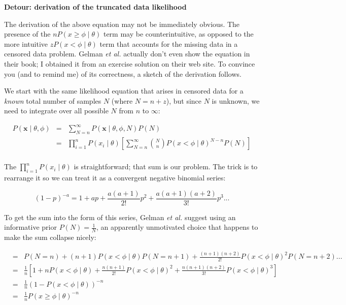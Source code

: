 \textbf{Detour: derivation of the truncated data likelihood}

The derivation of the above equation may not be immediately obvious.
The presence of the $n P(x \geq \phi \mid \theta)$ term may be
counterintuitive, as opposed to the more intuitive $z P(x < \phi \mid
\theta)$ term that accounts for the missing data in a censored data
problem. Gelman \emph{et al.} actually don't even show the equation in
their book; I obtained it from an exercise solution on their web site.
To convince you (and to remind me) of its correctness, a sketch of the
derivation follows.

We start with the same likelihood equation that arises in censored
data for a \emph{known} total number of samples $N$ (where $N=n+z$),
but since $N$ is unknown, we need to integrate over all possible $N$
from $n$ to $\infty$:

\begin{eqnarray*}
   P(\mathbf{x} \mid \theta, \phi) & = &
    \sum_{N=n}^{\infty}   P(\mathbf{x} \mid \theta, \phi, N) P(N)\\
   & = & 
    \prod_{i=1}^n P(x_i \mid \theta) 
    \left[
      \sum_{N=n}^\infty {N \choose n} P(x < \phi \mid \theta)^{N-n} P(N)
    \right]\\
\end{eqnarray*}

The $\prod_{i=1}^n P(x_i \mid \theta)$ is straightforward; that sum is
our problem. The trick is to rearrange it so we can treat it as a
convergent negative binomial series:

\[
   (1-p)^{-a} = 1 + ap + \frac{a(a+1)}{2!} p^2 +
   \frac{a(a+1)(a+2)}{3!} p^3...
\]

To get the sum into the form of this series, Gelman \emph{et al.}
suggest using an informative prior $P(N) = \frac{1}{N}$, an apparently
unmotivated choice that happens to make the sum collapse nicely:

\begin{eqnarray*}
 &=& P(N=n) 
    + (n+1) P(x < \phi \mid \theta) P(N=n+1) 
    + \frac{(n+1)(n+2)}{2!} P(x < \phi \mid \theta)^2 P(N=n+2) ...\\
 &= & \frac{1}{n} \left[
      1 
      + n P(x < \phi \mid \theta)
      + \frac{n(n+1)}{2!} P(x < \phi \mid \theta)^2 
      + \frac{n(n+1)(n+2)}{3!} P(x < \phi \mid \theta)^3 \right]\\
 &=& \frac{1}{n} (1 - P(x < \phi \mid \theta))^{-n}\\
 &=& \frac{1}{n} P(x \geq \phi \mid \theta)^{-n}\\
\end{eqnarray*}

